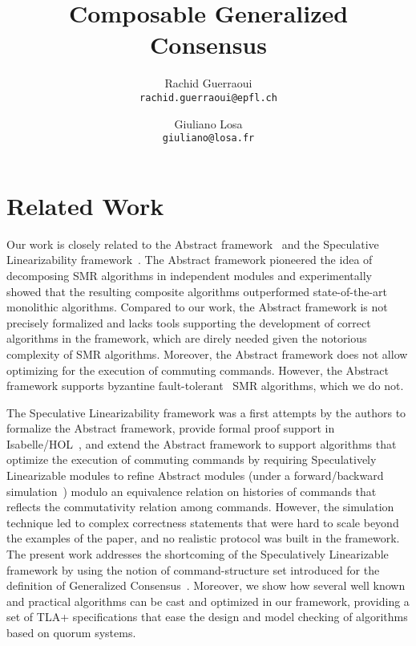 \documentclass{llncs}
\title{Composable Generalized Consensus}
\author{%
  Rachid Guerraoui\\
  \texttt{rachid.guerraoui@epfl.ch}
  \and
  Giuliano Losa\\
  \texttt{giuliano@losa.fr}
}
\date{}
\begin{document}
\maketitle




\newpage



%


\section{Related Work}
\label{sec:related}

Our work is closely related to the Abstract
framework~\cite{GuerraouiETAL10Next700BftProtocols}
and the Speculative Linearizability
framework~\cite{GuerraouiKuncakLosa12SpeculativeLinearizability}. The
Abstract framework pioneered the idea of decomposing SMR algorithms in
independent modules and experimentally showed that the resulting composite
algorithms outperformed state-of-the-art monolithic algorithms. Compared
to our work, the Abstract framework is not precisely formalized and lacks
tools supporting the development of correct algorithms in the framework,
which are direly needed given the notorious complexity of SMR algorithms.
Moreover, the Abstract framework does not allow optimizing for the execution
of commuting commands. However, the Abstract framework supports byzantine
fault-tolerant~\cite{LamportShostakPease82ByzantineGeneralsProblem} SMR
algorithms, which we do not. 

The Speculative Linearizability framework was a
first attempts by the authors to formalize the Abstract framework, provide
formal proof support in Isabelle/HOL~\cite{NipkowPaulsonWenzel02IsabelleHOL},
and extend the Abstract framework to support algorithms that optimize
the execution of commuting commands by requiring Speculatively
Linearizable modules to refine Abstract modules (under a forward/backward
simulation~\cite{LynchVaandrager95ForwardBackwardSimulationsIUntimedSystems})
modulo an equivalence relation on histories of commands that reflects the
commutativity relation among commands. However, the simulation technique led to
complex correctness statements that were hard to scale beyond the examples of
the paper, and no realistic protocol was built in the framework. The present
work addresses the shortcoming of the Speculatively Linearizable framework by
using the notion of command-structure set introduced for the definition of
Generalized Consensus~\cite{Lamport05GeneralizeConsensus}. Moreover, we show how
several well known and practical algorithms can be cast and optimized in our
framework, providing a set of TLA+ specifications that ease the design and model
checking of algorithms based on quorum systems.
\end{document}
